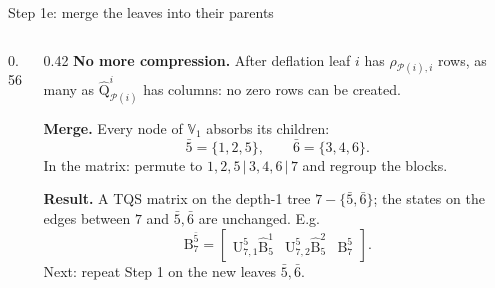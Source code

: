 \documentclass[aspectratio=169,11pt]{beamer}
\begin{document}
\begin{frame}{Step 1e: merge the leaves into their parents}
\begin{columns}[c]
\begin{column}{0.56\textwidth}
\end{column}

\begin{column}{0.42\textwidth}
\footnotesize
\textbf{No more compression.} After deflation leaf $i$ has $\rho_{\mathcal{P}(i),i}$ rows,
as many as $\hat{\mathrm{Q}}^i_{\mathcal{P}(i)}$ has columns: no zero rows can be created.

\vspace{2mm}
\textbf{Merge.} Every node of $\mathbb{V}_1$ absorbs its children:
\[
\bar{5}=\{1,2,5\},\qquad \bar{6}=\{3,4,6\}.
\]
In the matrix: permute to $1,2,5\,|\,3,4,6\,|\,7$ and regroup the blocks.

\vspace{2mm}
\textbf{Result.} A TQS matrix on the depth-1 tree $7-\{\bar{5},\bar{6}\}$; the states on
the edges between $7$ and $\bar{5},\bar{6}$ are unchanged. E.g.
\[
\mathrm{B}^{\bar{5}}_7=\begin{bmatrix}\mathrm{U}^5_{7,1}\hat{\mathrm{B}}^1_5 & \mathrm{U}^5_{7,2}\hat{\mathrm{B}}^2_5 & \mathrm{B}^5_7\end{bmatrix}.
\]
Next: repeat Step 1 on the new leaves $\bar{5},\bar{6}$.
\end{column}
\end{columns}
\end{frame}
\end{document}

